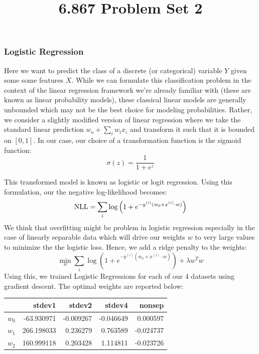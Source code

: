 \documentclass[10pt]{article}
\begin{document}
	\title{6.867 Problem Set 2}
	\maketitle


\subsubsection*{Logistic Regression}
Here we want to predict the class of a discrete (or categorical) variable $Y$ given some some features $X$. While we can formulate this classification problem in the context of the linear regression framework we're already familiar with (these are known as linear probability models), these classical linear models are generally unbounded which may not be the best choice for modeling probabilities. Rather, we consider a slightly modified version of linear regression where we take the standard linear prediction $w_o + \sum_i w_i x_i$ and transform it such that it is bounded on $[0,1]$. In our case, our choice of a transformation function is the sigmoid function:
\begin{equation*}
	\sigma(z) = \frac{1}{1+e^{z}}
\end{equation*}

This transformed model is known as logistic or logit regression. Using this formulation, our the negative log-likelihood becomes:
\begin{equation*}
	\textnormal{NLL}=\sum_i \log \left(1+e^{-y^{(i)}(w_0 + x^{(i)}\cdot w)} \right)
\end{equation*}
We think that overfitting might be problem in logistic regression especially in the case of linearly separable data which will drive our weights $w$ to very large values to minimize the the logistic loss. Hence, we add a ridge penalty to the weights:
\begin{equation*}
	\min_w \sum_i \log \left(1+e^{-y^{(i)}(w_0 + x^{(i)}\cdot w)} \right) + \lambda w^T w
\end{equation*}
Using this, we trained Logistic Regressions for each of our 4 datasets using gradient descent. The optimal weights are reported below:

\begin{table}[ht]
\centering
{}
\begin{tabular}{lrrrr}
\toprule
{}    &      stdev1 &    stdev2 &    stdev4 & nonsep\\
\midrule
$w_0$ &  -63.930971 & -0.009267 & -0.046649 & 0.000597\\
$w_1$ &  266.198033 &  0.236279 &  0.763589 & -0.024737\\
$w_2$ &  160.999118 &  0.203428 &  1.114811 & -0.023726\\
\bottomrule
\end{tabular}
\end{table}
\end{document}
